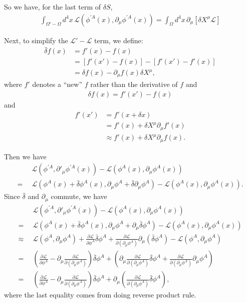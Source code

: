 \documentclass{book}
\numberwithin{equation}{section}
\theoremstyle{definition}
\newcommand{\p}{\partial}
\newcommand{\lag}{\mathcal{L}}
\newcommand{\nn}{\nonumber}
\begin{document}
So we have, for the last term of $\delta S$,
\begin{align}
\int_{\Omega' - \Omega} d^4x\, \lag\left(\phi^{'A}(x), \p_\mu\phi^{'A}(x) \right) = \int_\Omega d^4x\,\p_\mu \left[ \delta X^\mu \lag \right]
\end{align}

Next, to simplify the $\lag'-\lag$ term, we define:
\begin{align}
\bar{\delta} f(x) &= f'(x) - f(x) \nonumber\\
&= \left[ f'(x') - f(x) \right] - \left[f'(x') - f'(x)\right]\nonumber\\
&= \delta f(x) - \p_\mu f(x)\delta X^\mu,
\end{align}
where $f'$ denotes a ``new'' $f$ rather than the derivative of $f$ and
\begin{align}
\delta f(x) = f'(x') - f(x)
\end{align}
and
\begin{align}
f'(x') &= f'(x+\delta x)\nonumber\\
&= f'(x) + \delta X^\mu \p_\mu f'(x)\nonumber\\
&\approx f'(x) + \delta X^\mu \p_\mu f(x).
\end{align}

Then we have
\begin{align}
&\lag\left(\phi^{'A}, \p'_\mu \phi^{'A}(x)\right) - \lag\left(\phi^A(x),\p_\mu\phi^A(x)\right) \nonumber\\
=\,\,\,&\lag\left(\phi^A(x) + \bar{\delta}\phi^A(x), \p_\mu\phi^A + \bar{\delta}\p_\mu\phi^A \right) - \lag\left(\phi^A(x), \p_\mu \phi^A(x)\right).
\end{align}
Since $\bar{\delta}$ and $\p_\mu$ commute, we have
\begin{align}
&\lag\left(\phi^{'A}, \p'_\mu \phi^{'A}(x)\right) - \lag\left(\phi^A(x),\p_\mu\phi^A(x)\right) \nonumber\\
=\,\,\,&\lag\left( \phi^A(x) + \bar{\delta}\phi^A(x), \p_\mu\phi^A + \p_\mu\bar{\delta}\phi^A\right) - \lag\left(\phi^A(x), \p_\mu \phi^A(x)\right)\nonumber\\
\approx\,\,\,& \lag\left(\phi^A, \p_\mu\phi^A\right) + \frac{\p \lag}{\p \phi^A}\bar{\delta}\phi^A + \frac{\p \lag}{\p (\p_\mu \phi^A)}\p_\mu (\bar{\delta}\phi^A) - \lag\left(\phi^A, \p_\mu\phi^A \right) \nn \\
=\,\,\,& \left(\frac{\p \lag }{\p \phi^A} - \p_\mu\frac{\p \lag}{\p( \p_\mu \phi^A) }\right)\bar{\delta}\phi^A + \left(\p_\mu \frac{\p \lag}{\p( \p_\mu \phi^A)}\bar{\delta}\phi^A + \frac{\p \lag}{\p( \p_\mu \phi^A)}\p_\mu\phi^A\right)\nn\\
=\,\,\, & \left(\frac{\p \lag }{\p \phi^A} - \p_\mu\frac{\p \lag}{\p( \p_\mu \phi^A )}\right)\bar{\delta}\phi^A + \p_\mu \left(\frac{\p \lag}{\p( \p_\mu \phi^A)}\bar{\delta}\phi^A\right),
\end{align}
where the last equality comes from doing reverse product rule.\\
\end{document}
